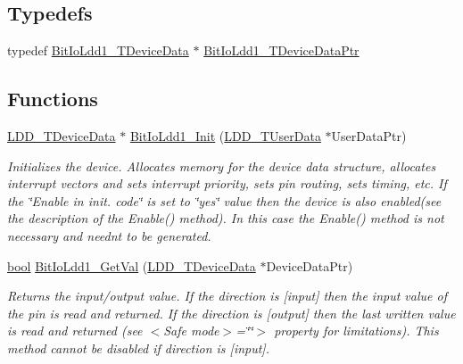 \subsection*{Typedefs}
\begin{DoxyCompactItemize}
\item 
typedef \hyperlink{struct_bit_io_ldd1___t_device_data}{Bit\+Io\+Ldd1\+\_\+\+T\+Device\+Data} $\ast$ \hyperlink{group___bit_io_ldd1__module_ga340fc98ffd5cf9615926496b47eaa19a}{Bit\+Io\+Ldd1\+\_\+\+T\+Device\+Data\+Ptr}
\end{DoxyCompactItemize}
\subsection*{Functions}
\begin{DoxyCompactItemize}
\item 
\hyperlink{group___p_e___types__module_gac5cf1362f1f0e3a2ce71b1bf2276d091}{L\+D\+D\+\_\+\+T\+Device\+Data} $\ast$ \hyperlink{group___bit_io_ldd1__module_gadb85449174dc263f061e143166eb86c5}{Bit\+Io\+Ldd1\+\_\+\+Init} (\hyperlink{group___p_e___types__module_ga0b66a73f87238a782318aa0be7578e35}{L\+D\+D\+\_\+\+T\+User\+Data} $\ast$User\+Data\+Ptr)
\begin{DoxyCompactList}\small\item\em Initializes the device. Allocates memory for the device data structure, allocates interrupt vectors and sets interrupt priority, sets pin routing, sets timing, etc. If the \char`\"{}\+Enable
    in init. code\char`\"{} is set to \char`\"{}yes\char`\"{} value then the device is also enabled(see the description of the Enable() method). In this case the Enable() method is not necessary and needn\textquotesingle{}t to be generated. \end{DoxyCompactList}\item 
\hyperlink{group___p_e___types__module_ga97a80ca1602ebf2303258971a2c938e2}{bool} \hyperlink{group___bit_io_ldd1__module_gab3360cb6abf61e5983bee6a39f337789}{Bit\+Io\+Ldd1\+\_\+\+Get\+Val} (\hyperlink{group___p_e___types__module_gac5cf1362f1f0e3a2ce71b1bf2276d091}{L\+D\+D\+\_\+\+T\+Device\+Data} $\ast$Device\+Data\+Ptr)
\begin{DoxyCompactList}\small\item\em Returns the input/output value. If the direction is \mbox{[}input\mbox{]} then the input value of the pin is read and returned. If the direction is \mbox{[}output\mbox{]} then the last written value is read and returned (see $<$\+Safe mode$>$=\char`\"{}\char`\"{}$>$ property for limitations). This method cannot be disabled if direction is \mbox{[}input\mbox{]}. \end{DoxyCompactList}\item 

\end{DoxyCompactItemize}
